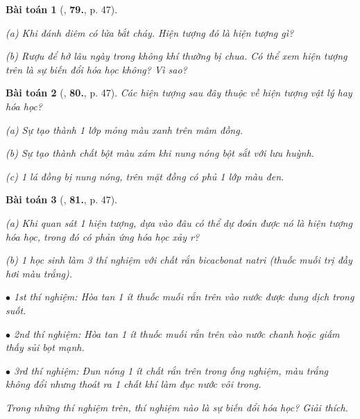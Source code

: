 \documentclass{article}
\numberwithin{equation}{section}
\newtheorem{baitoan}{Bài toán}
\begin{document}
\begin{baitoan}[\cite{An_400_BT_Hoa_Hoc_8_2020}, \textbf{79.}, p. 47]
\begin{enumerate*}
	\item[(a)] Khi đánh diêm có lửa bắt cháy. Hiện tượng đó là hiện tượng gì?
	\item[(b)] Rượu để hở lâu ngày trong không khí thường bị chua. Có thể xem hiện tượng trên là sự biến đổi hóa học không? Vì sao?
	\end{enumerate*}
\end{baitoan}

\begin{baitoan}[\cite{An_400_BT_Hoa_Hoc_8_2020}, \textbf{80.}, p. 47]
	Các hiện tượng sau đây thuộc về hiện tượng vật lý hay hóa học?
	\begin{enumerate*}
		\item[(a)] Sự tạo thành 1 lớp mỏng màu xanh trên mâm đồng.
		\item[(b)] Sự tạo thành chất bột màu xám khi nung nóng bột sắt với lưu huỳnh.
		\item[(c)] 1 lá đồng bị nung nóng, trên mặt đồng có phủ 1 lớp màu đen.
	\end{enumerate*}
\end{baitoan}

\begin{baitoan}[\cite{An_400_BT_Hoa_Hoc_8_2020}, \textbf{81.}, p. 47]
	\begin{enumerate*}
		\item[(a)] Khi quan sát 1 hiện tượng, dựa vào đâu có thể dự đoán được nó là hiện tượng hóa học, trong đó có phản ứng hóa học xảy r?
		\item[(b)] 1 học sinh làm 3 thí nghiệm với chất rắn bicacbonat natri \emph{} (thuốc muối trị đầy hơi màu trắng).
		\begin{enumerate*}
			\item[$\bullet$] 1st thí nghiệm: Hòa tan 1 ít thuốc muối rắn trên vào nước được dung dịch trong suốt.
			\item[$\bullet$] 2nd thí nghiệm: Hòa tan 1 ít thuốc muối rắn trên vào nước chanh hoặc giấm thấy sủi bọt mạnh.
			\item[$\bullet$] 3rd thí nghiệm: Đun nóng 1 ít chất rắn trên trong ống nghiệm, màu trắng không đổi nhưng thoát ra 1 chất khí làm đục nước vôi trong.
		\end{enumerate*}
		Trong những thí nghiệm trên, thí nghiệm nào là sự biến đổi hóa học? Giải thích.
	\end{enumerate*}
\end{baitoan}
\end{document}
